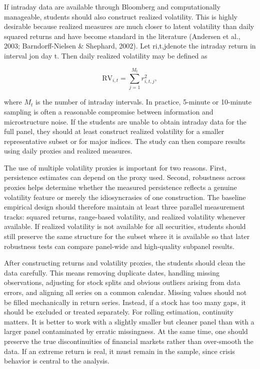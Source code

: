 \documentclass[12pt]{article}
\begin{document}
If intraday data are available through Bloomberg and computationally manageable, students should also construct realized volatility. This is highly desirable because realized measures are much closer to latent volatility than daily squared returns and have become standard in the literature (Andersen et al., 2003; Barndorff-Nielsen \& Shephard, 2002). Let ri,t,jdenote the intraday return in interval jon day t. Then daily realized volatility may be defined as

\[\mathrm{RV}_{i,t} = \sum_{j=1}^{M_t} r_{i,t,j}^2,\]

where $M_t$ is the number of intraday intervals. In practice, 5-minute or 10-minute sampling is often a reasonable compromise between information and microstructure noise. If the students are unable to obtain intraday data for the full panel, they should at least construct realized volatility for a smaller representative subset or for major indices. The study can then compare results using daily proxies and realized measures.

The use of multiple volatility proxies is important for two reasons. First, persistence estimates can depend on the proxy used. Second, robustness across proxies helps determine whether the measured persistence reflects a genuine volatility feature or merely the idiosyncrasies of one construction. The baseline empirical design should therefore maintain at least three parallel measurement tracks: squared returns, range-based volatility, and realized volatility whenever available. If realized volatility is not available for all securities, students should still preserve the same structure for the subset where it is available so that later robustness tests can compare panel-wide and high-quality subpanel results.

After constructing returns and volatility proxies, the students should clean the data carefully. This means removing duplicate dates, handling missing observations, adjusting for stock splits and obvious outliers arising from data errors, and aligning all series on a common calendar. Missing values should not be filled mechanically in return series. Instead, if a stock has too many gaps, it should be excluded or treated separately. For rolling estimation, continuity matters. It is better to work with a slightly smaller but cleaner panel than with a larger panel contaminated by erratic missingness. At the same time, one should preserve the true discontinuities of financial markets rather than over-smooth the data. If an extreme return is real, it must remain in the sample, since crisis behavior is central to the analysis.
\end{document}
